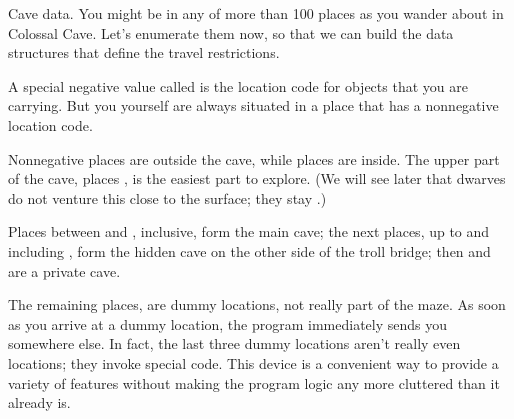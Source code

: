 Cave data. You might be in any of more than 100 places as you wander
about in Colossal Cave. Let's enumerate them now, so that we can
build the data structures that define the travel restrictions.

A special negative value called  is the location code for objects that
you are carrying. But you yourself are always situated in a place that has a
nonnegative location code.

Nonnegative places  are outside the cave, while places 
are inside.  The upper part of the cave, places , is the easiest part
to explore.  (We will see later that dwarves do not venture this close to the
surface; they stay .)

Places between  and , inclusive, form the main cave;
the next places, up to and including , form the hidden cave on the
other side of the troll bridge; then  and  are a private cave.

The remaining places,  are dummy locations,
not really part of the maze. As soon as you arrive at a dummy
location, the program immediately sends you somewhere else.
In fact, the last three dummy locations aren't really even locations;
they invoke special code.
This device is a convenient way to provide a variety of features without
making the program logic any more cluttered than it already is.

